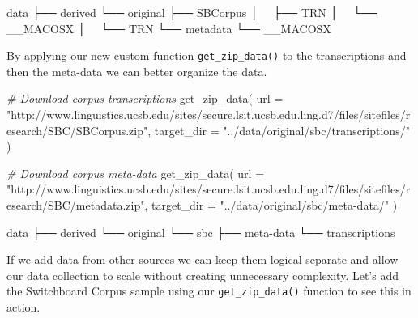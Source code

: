 \documentclass[
  letterpaper,
]{latex/krantz}
\newenvironment{Shaded}{\begin{snugshade}}{\end{snugshade}}
\newcommand{\AttributeTok}[1]{\textcolor[rgb]{0.00,0.00,0.00}{#1}}
\newcommand{\CommentTok}[1]{\textcolor[rgb]{0.00,0.00,0.00}{\textit{#1}}}
\newcommand{\ExtensionTok}[1]{\textcolor[rgb]{0.00,0.00,0.00}{#1}}
\newcommand{\FunctionTok}[1]{\textcolor[rgb]{0.00,0.00,0.00}{#1}}
\newcommand{\NormalTok}[1]{\textcolor[rgb]{0.00,0.00,0.00}{#1}}
\newcommand{\StringTok}[1]{\textcolor[rgb]{0.00,0.00,0.00}{#1}}
\begin{document}
\begin{Shaded}
\begin{Highlighting}[]
\ExtensionTok{data}
\ExtensionTok{├──}\NormalTok{ derived}
\ExtensionTok{└──}\NormalTok{ original}
    \ExtensionTok{├──}\NormalTok{ SBCorpus}
    \ExtensionTok{│  }\NormalTok{ ├── TRN}
    \ExtensionTok{│  }\NormalTok{ └── \_\_MACOSX}
    \ExtensionTok{│  }\NormalTok{     └── TRN}
    \ExtensionTok{└──}\NormalTok{ metadata}
        \ExtensionTok{└──}\NormalTok{ \_\_MACOSX}
\end{Highlighting}
\end{Shaded}

By applying our new custom function \texttt{get\_zip\_data()} to the
transcriptions and then the meta-data we can better organize the data.

\begin{Shaded}
\begin{Highlighting}[]
\CommentTok{\# Download corpus transcriptions}
\FunctionTok{get\_zip\_data}\NormalTok{(}
  \AttributeTok{url =} \StringTok{"http://www.linguistics.ucsb.edu/sites/secure.lsit.ucsb.edu.ling.d7/files/sitefiles/research/SBC/SBCorpus.zip"}\NormalTok{, }
  \AttributeTok{target\_dir =} \StringTok{"../data/original/sbc/transcriptions/"}
\NormalTok{)}

\CommentTok{\# Download corpus meta{-}data}
\FunctionTok{get\_zip\_data}\NormalTok{(}
  \AttributeTok{url =} \StringTok{"http://www.linguistics.ucsb.edu/sites/secure.lsit.ucsb.edu.ling.d7/files/sitefiles/research/SBC/metadata.zip"}\NormalTok{, }
  \AttributeTok{target\_dir =} \StringTok{"../data/original/sbc/meta{-}data/"}
\NormalTok{)}
\end{Highlighting}
\end{Shaded}

\begin{Shaded}
\begin{Highlighting}[]
\ExtensionTok{data}
\ExtensionTok{├──}\NormalTok{ derived}
\ExtensionTok{└──}\NormalTok{ original}
    \ExtensionTok{└──}\NormalTok{ sbc}
        \ExtensionTok{├──}\NormalTok{ meta{-}data}
        \ExtensionTok{└──}\NormalTok{ transcriptions}
\end{Highlighting}
\end{Shaded}

If we add data from other sources we can keep them logical separate and
allow our data collection to scale without creating unnecessary
complexity. Let's add the Switchboard Corpus sample using our
\texttt{get\_zip\_data()} function to see this in action.
\end{document}
